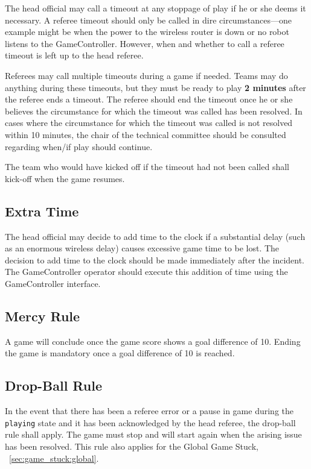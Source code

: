 The head official may call a timeout at any stoppage of play if he or she deems it necessary.
A referee timeout should only be called in dire circumstances---one example might be when the power to the wireless router is down or no robot listens to the GameController.
However, when and whether to call a referee timeout is left up to the head referee.

Referees may call multiple timeouts during a game if needed.
Teams may do anything during these timeouts, but they must be ready to play \textbf{2 minutes} after the referee ends a timeout.
The referee should end the timeout once he or she believes the circumstance for which the timeout was called has been resolved.
In cases where the circumstance for which the timeout was called is not resolved within 10 minutes, the chair of the technical committee should be consulted regarding when/if play should continue.

The team who would have kicked off if the timeout had not been called shall kick-off when the game resumes.

\subsection{Extra Time}
\label{sec:extra_time}

The head official may decide to add time to the clock if a substantial delay (such as an enormous wireless delay) causes excessive game time to be lost.
The decision to add time to the clock should be made immediately after the incident.
The GameController operator should execute this addition of time using the GameController interface.

\subsection{Mercy Rule}
\label{sec:mercy_rule}

A game will conclude once the game score shows a goal difference of 10.
Ending the game is mandatory once a goal difference of 10 is reached.

\subsection{Drop-Ball Rule}
\label{sec:drop_ball_rule}

In the event that there has been a referee error or a pause in game during the \texttt{playing} state and it has been acknowledged by the head referee, the drop-ball rule shall apply.
The game must stop and will start again when the arising issue has been resolved.
This rule also applies for the Global Game Stuck, \cf~\cref{sec:game_stuck:global}.

